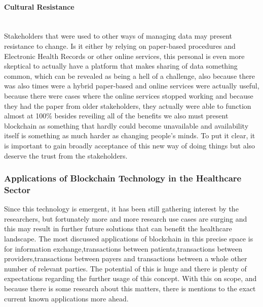 \paragraph{Cultural Resistance} \mbox{}\\
Stakeholders that were used to other ways of managing data may present resistance to change. Is it either by relying on paper-based procedures and Electronic Health Records or other online services, this personal is even more skeptical to actually have a platform that makes sharing of data something common, which can be revealed as being a hell of a challenge, also because there was also times were a hybrid paper-based and online services were actually useful, because there were cases where the online services stopped working and because they had the paper from older stakeholders, they actually were able to function almost at 100\% besides reveiling all of the benefits we also must present blockchain as something that hardly could become unavailable and availability itself is something as much harder as changing people's minds. To put it clear, it is important to gain broadly acceptance of this new way of doing things but also deserve the trust from the stakeholders.

\subsubsection{Applications of Blockchain Technology in the Healthcare Sector}
Since this technology is emergent, it has been still gathering interest by the researchers, but fortunately more and more research use cases are surging and this may result in further future solutions that can benefit the healthcare landscape. The most discussed applications of blockchain in this precise space is for information exchange,transactions between patients,transactions between providers,transactions between payers and transactions between a whole other number of relevant parties. The potential of this is huge and there is plenty of expectations regarding the further usage of this concept.
With this on scope, and because there is some research about this matters, there is mentions to the exact current known applications more ahead.

